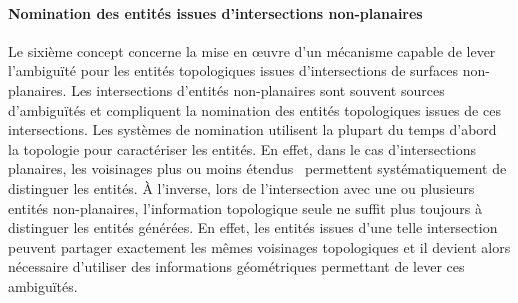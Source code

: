 \paragraph*{Nomination des entités issues d'intersections non-planaires}


Le sixième concept concerne la mise en \oe uvre d'un mécanisme capable
de lever l'ambiguïté pour les entités topologiques issues d'intersections de
surfaces non-planaires. %
Les intersections d'entités non-planaires sont souvent sources d'ambiguïtés et
compliquent la nomination des entités topologiques issues de ces
intersections. %
Les systèmes de nomination utilisent la plupart du temps d'abord la topologie
pour caractériser les entités. %
En effet, dans le cas d'intersections planaires, les voisinages plus ou
moins étendus~\cite{chen1995representation} permettent systématiquement de distinguer les entités. %
À l'inverse, lors de l'intersection avec une ou plusieurs entités non-planaires,
l'information topologique seule ne suffit plus toujours à distinguer les entités
générées. %
En effet, les entités issues d'une telle intersection peuvent partager
exactement les mêmes voisinages topologiques et il devient alors nécessaire
d'utiliser des informations géométriques permettant de lever ces ambiguïtés.

